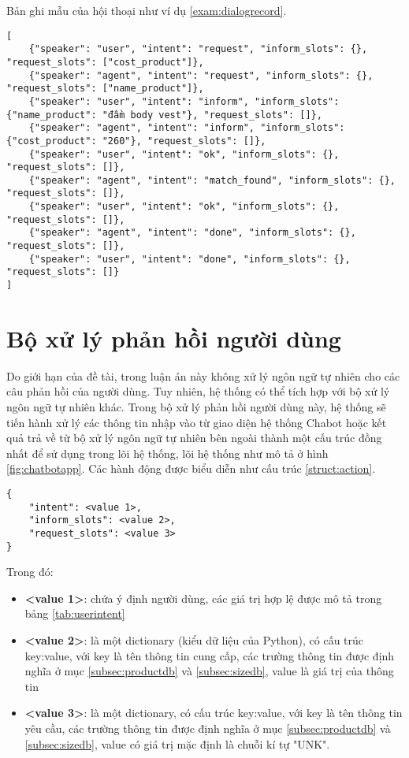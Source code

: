 Bản ghi mẫu của hội thoại như ví dụ \ref{exam:dialogrecord}.

\renewcommand{\lstlistingname}{Ví dụ}
\begin{lstlisting}[caption={Một đoạn hội thoại},label={exam:dialogrecord},language=code_vn,firstnumber=1]
[
    {"speaker": "user", "intent": "request", "inform_slots": {}, "request_slots": ["cost_product"]},
    {"speaker": "agent", "intent": "request", "inform_slots": {}, "request_slots": ["name_product"]},
    {"speaker": "user", "intent": "inform", "inform_slots": {"name_product": "đầm body vest"}, "request_slots": []},
    {"speaker": "agent", "intent": "inform", "inform_slots": {"cost_product": "260"}, "request_slots": []},
    {"speaker": "user", "intent": "ok", "inform_slots": {}, "request_slots": []},
    {"speaker": "agent", "intent": "match_found", "inform_slots": {}, "request_slots": []},
    {"speaker": "user", "intent": "ok", "inform_slots": {}, "request_slots": []},
    {"speaker": "agent", "intent": "done", "inform_slots": {}, "request_slots": []},
    {"speaker": "user", "intent": "done", "inform_slots": {}, "request_slots": []}
]
\end{lstlisting}

\section{Bộ xử lý phản hồi người dùng}
Do giới hạn của đề tài, trong luận án này không xử lý ngôn ngữ tự nhiên cho các câu phản hồi của người dùng. Tuy nhiên, hệ thống có thể tích hợp với bộ xử lý ngôn ngữ tự nhiên khác. Trong bộ xử lý phản hồi người dùng này, hệ thống sẽ tiến hành xử lý các thông tin nhập vào từ giao diện hệ thống Chabot hoặc kết quả trả về từ bộ xử lý ngôn ngữ tự nhiên bên ngoài thành một cấu trúc đồng nhất để sử dụng trong lõi hệ thống, lõi hệ thống như mô tả ở hình \ref{fig:chatbotapp}. Các hành động được biểu diễn như cấu trúc \ref{struct:action}.

\renewcommand{\lstlistingname}{Cấu trúc}
\begin{lstlisting}[caption={Cấu trúc cho một hành động},label={struct:action},language=structure,firstnumber=1]
{
    "intent": <value 1>,
    "inform_slots": <value 2>,
    "request_slots": <value 3>
}
\end{lstlisting}

Trong đó:

\begin{itemize}
    \item \textbf{<value 1>}: chứa ý định người dùng, các giá trị hợp lệ được mô tả trong bảng \ref{tab:userintent}
    \item \textbf{<value 2>}: là một dictionary (kiểu dữ liệu của Python), có cấu trúc key:value, với key là tên thông tin cung cấp, các trường thông tin được định nghĩa ở mục \ref{subsec:productdb} và \ref{subsec:sizedb}, value là giá trị của thông tin
    \item \textbf{<value 3>}: là một dictionary, có cấu trúc key:value, với key là tên thông tin yêu cầu, các trường thông tin được định nghĩa ở mục \ref{subsec:productdb} và \ref{subsec:sizedb}, value có giá trị mặc định là chuỗi kí tự "UNK".
\end{itemize}

